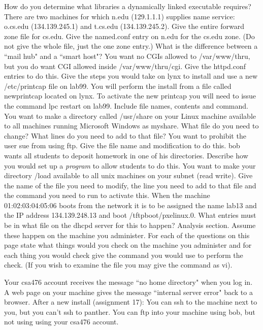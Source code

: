 How do you determine what libraries a dynamically linked executable
requires?
\vskip 0.6in
\ques
There are two machines for which {\ltt{}n.edu} ({\ltt{}129.1.1.1})
supplies name service:
{\ltt{}o.cs.edu} ({\ltt{}134.139.245.1}) and 
{\ltt{}t.cs.edu} ({\ltt{}134.139.245.2}).
Give the entire forward zone file for {\ltt{}cs.edu}.
\vskip 4.2in
\ques
Give the {\ltt{}named.conf} entry on {\ltt{}n.edu} for the {\ltt{}cs.edu} zone.
(Do not give the whole file, just the one zone entry.)
\vskip 1.2in
\vfill
\eject
\ques
What is the difference between a ``mail hub" and a ``smart host"?
\vskip 1.2in
\ques
You want no CGIs allowed to {\ltt{}/var/www/thru},
but you do want CGI allowed inside {\ltt{}/var/www/thru/cgi}.
Give the {\ltt{}httpd.conf} entries to do this.
\vskip 1.8in
\ques
Give the steps you would take on {\ltt{}lynx} to install and use
a new {\ltt{}/etc/printcap} file on {\ltt{}lab99}.
You will perform the install from a file called {\ltt{}newprintcap}
located on {\ltt{}lynx}.
To activate the new printcap you will need to issue the command
{\ltt{}lpc restart} on {\ltt{}lab99}.
Include file names, contents and command.
\vskip 2.0in
\ques
You want to make a directory called {\ltt{}/usr/share} on your
Linux machine available to all machines running Microsoft Windows as
{\ltt{}myshare}.
What file do you need to change?
What lines do you need to add to that file?
\vskip 1.2in
\vfill\eject
\ques
You want to prohibit the user {\ltt{}sue} from using ftp.
Give the file name and modification to do this.
\vskip 1.0in
\ques
{\ltt{}bob} wants all students to deposit homework in one of his
directories.
Describe how you would set up a {\it program} to allow students to do this.
\vskip 1.3in
\ques
You want to make your directory
{\ltt{}/load}
available to all unix machines on your subnet (read write).
Give the name of the file you need to modify, the line you need to
add to that file and the command you need to run to activate this.
\vskip 1.0in
\ques
When the machine {\ltt{}01:02:03:04:05:06} boots from the network
it is to be assigned the name {\ltt{}lab13} and the IP address
{\ltt{}134.139.248.13} and boot {\ltt{}/tftpboot/pxelinux.0}.
What entries must be in what file on the dhcpd server
for this to happen?
\vskip 2.0in
\vfill\eject
Analysis section. Assume these happen on the machine you administer.
For each of the questions on this page
state what things would you check on the machine you administer
and for each thing you would check give the command you would use to
perform the check. (If you wish to examine the file you may give the
command as {\ltt{}vi}).

\ques
Your {\ltt{}csa476} account receives the message ``no home directory"
when you log in.
\vfill
\ques
A web page on your machine gives the message ``internal server
error" back to a browser.
\vfill
\ques
After a new install (assignment 17):
You can ssh to the machine next to you, but you can't
ssh to panther.
\vfill
\ques
You can ftp into your machine using {\ltt{}bob}, but not
using using your {\ltt{}csa476} account.
\bye
